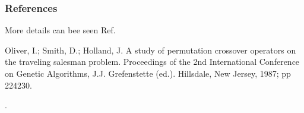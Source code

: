 \documentclass[letterpaper,10pt,english]{sphinxmanual}
\begin{document}
\begin{fulllineitems}
\begin{quote}
\begin{description}
\begin{description}
\end{description}

\end{description}\end{quote}
\subsubsection*{References}

\sphinxAtStartPar
More details can bee seen Ref. %
\begin{footnote}[1]\sphinxAtStartFootnote
Oliver, I.; Smith, D.; Holland, J. A study of permutation crossover
operators on the traveling salesman problem. Proceedings of the 2nd
International Conference on Genetic Algorithms, J.J. Grefenstette (ed.).
Hillsdale, New Jersey, 1987; pp 224\sphinxhyphen{}230.
%
\end{footnote}.

\end{fulllineitems}

\end{document}
